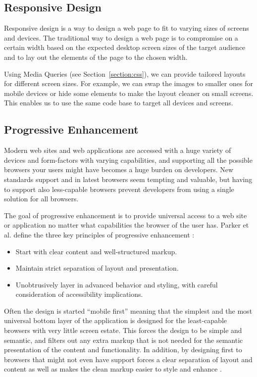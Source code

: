 \subsection{Responsive Design}

Responsive design is a way to design a web page to fit to varying
sizes of screens and devices. The traditional way to design a web page
is to compromise on a certain width based on the expected desktop
screen sizes of the target audience and to lay out the elements of the
page to the chosen width.

Using Media Queries (see Section~\ref{section:css}), we can provide
tailored layouts for different screen sizes. For example, we can swap
the images to smaller ones for mobile devices or hide some elements to
make the layout cleaner on small screens. This enables us to use the
same code base to target all devices and screens.

\subsection{Progressive Enhancement}
\label{subsection:progressive-enhancement}

Modern web sites and web applications are accessed with a huge variety
of devices and form-factors with varying capabilities, and supporting
all the possible browsers your users might have becomes a huge burden
on developers. New standards support and  in latest
browsers seem tempting and valuable, but having to support also
less-capable browsers prevent developers from using a single solution
for all browsers.

The goal of progressive enhancement is to provide universal access to
a web site or application no matter what capabilities the browser of
the user has. Parker et al. define the three key principles of
progressive enhancement \cite{parker2010designing}:

\begin{itemize}
\item Start with clear content and well-structured markup.
\item Maintain strict separation of layout and presentation.
\item Unobtrusively layer in advanced behavior and styling, with
  careful consideration of accessibility implications.
\end{itemize}

Often the design is started ``mobile first'' meaning that the simplest
and the most universal bottom layer of the application is designed for
the least-capable browsers with very little screen estate. This forces
the design to be simple and semantic, and filters out any extra markup
that is not needed for the semantic presentation of the content and
functionality. In addition, by designing first to browsers that might
not even have  support forces a clear separation of layout
and content as well as makes the clean markup easier to style and
enhance \cite{parker2010designing}.


